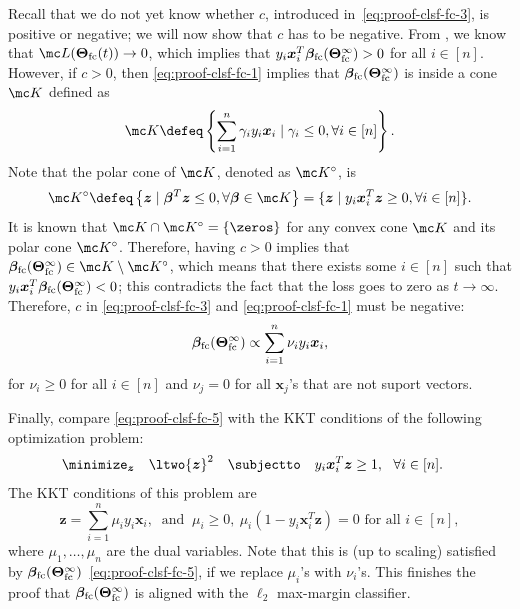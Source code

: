\documentclass{article} %
\def\vx{{\bm{x}}}
\def\vz{{\bm{z}}}
\newcommand{\vbeta}{{\bm{\beta}}}
\newcommand{\vbetafc}{\vbeta_{\rm fc}}
\newcommand{\bTheta}{\bm{\Theta}}
\newcommand{\bThetafc}{\bTheta_{\rm fc}}
\begin{document}
Recall that we do not yet know whether $c$, introduced in~\eqref{eq:proof-clsf-fc-3}, is positive or negative; we will now show that $c$ has to be negative.
From \citet{lyu2020gradient}, we know that $\mc L(\bThetafc(t)) \to 0$, which implies that $y_i \vx_i^T \vbetafc(\bThetafc^\infty) > 0$ for all $i \in [n]$. However, if $c > 0$, then \eqref{eq:proof-clsf-fc-1} implies that $\vbetafc(\bThetafc^{\infty})$ is inside a cone $\mc K$ defined as
\begin{equation*}
    \mc K \defeq \left \{\sum_{i = 1}^n \gamma_i y_i \vx_i \mid \gamma_i \leq 0, \forall i \in [n] \right \}.
\end{equation*}
Note that the polar cone of $\mc K$, denoted as $\mc K^\circ$, is
\begin{equation*}
    \mc K^\circ \defeq \left \{ \vz \mid \vbeta^T \vz \leq 0, \forall \vbeta \in \mc K \right \}
    = \{\vz \mid y_i \vx_i^T \vz \geq 0, \forall i \in [n]\}.
\end{equation*}
It is known that $\mc K \cap \mc K^\circ = \{\zeros\}$ for any convex cone $\mc K$ and its polar cone $\mc K^\circ$. Therefore, having $c>0$ implies that $\vbetafc(\bThetafc^{\infty}) \in \mc K \setminus\mc K^\circ$, which means that there exists some $i \in [n]$ such that $y_i \vx_i^T \vbetafc(\bThetafc^\infty) < 0$; this contradicts the fact that the loss goes to zero as $t \to \infty$. Therefore, $c$ in \eqref{eq:proof-clsf-fc-3} and \eqref{eq:proof-clsf-fc-1} must be negative:
\begin{equation}
\label{eq:proof-clsf-fc-5}
    \vbetafc(\bThetafc^{\infty}) \propto \sum_{i = 1}^n \nu_i y_i \vx_i,
\end{equation}
for $\nu_i \geq 0$ for all $i \in [n]$ and $\nu_j = 0$ for all $\vx_j$'s that are not suport vectors.

Finally, compare \eqref{eq:proof-clsf-fc-5} with the KKT conditions of the following optimization problem:
\begin{align*}
    &\minimize_{\vz}\quad \ltwo{\vz}^2 
    \quad
    \subjectto \quad y_i \vx_i^T \vz \geq 1,~~\forall i\in[n].
\end{align*}
The KKT conditions of this problem are
\begin{equation*}
    \vz = \sum_{i=1}^n \mu_i y_i \vx_i,~\text{ and }~\mu_i \geq 0,~ \mu_i(1-y_i\vx_i^T \vz) = 0 \text{ for all } i \in [n],
\end{equation*}
where $\mu_1, \dots, \mu_n$ are the dual variables.
Note that this is (up to scaling) satisfied by $\vbetafc(\bThetafc^\infty)$~\eqref{eq:proof-clsf-fc-5}, if we replace $\mu_i$'s with $\nu_i$'s.
This finishes the proof that $\vbetafc(\bThetafc^{\infty})$ is aligned with the $\ell_2$ max-margin classifier.
\end{document}
